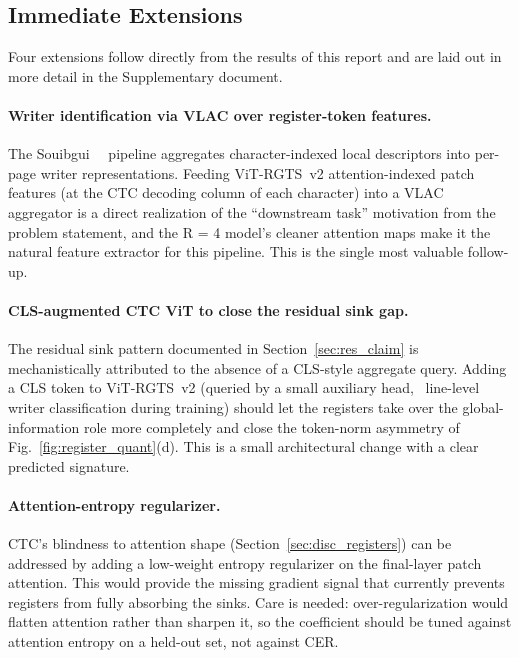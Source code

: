 \subsection{Immediate Extensions}

Four extensions follow directly from the results of this report and are laid out in more detail in the Supplementary document.

\paragraph{Writer identification via VLAC over register-token features.}
The Souibgui~\etal~\cite{souibgui2022vlac} pipeline aggregates character-indexed local descriptors into per-page writer representations. Feeding ViT-RGTS~v2 attention-indexed patch features (at the CTC decoding column of each character) into a VLAC aggregator is a direct realization of the ``downstream task'' motivation from the problem statement, and the R = 4 model's cleaner attention maps make it the natural feature extractor for this pipeline. This is the single most valuable follow-up.

\paragraph{CLS-augmented CTC ViT to close the residual sink gap.}
The residual sink pattern documented in Section~\ref{sec:res_claim} is mechanistically attributed to the absence of a CLS-style aggregate query. Adding a CLS token to ViT-RGTS~v2 (queried by a small auxiliary head, \eg\ line-level writer classification during training) should let the registers take over the global-information role more completely and close the token-norm asymmetry of Fig.~\ref{fig:register_quant}(d). This is a small architectural change with a clear predicted signature.

\paragraph{Attention-entropy regularizer.}
CTC's blindness to attention shape (Section~\ref{sec:disc_registers}) can be addressed by adding a low-weight entropy regularizer on the final-layer patch attention. This would provide the missing gradient signal that currently prevents registers from fully absorbing the sinks. Care is needed: over-regularization would flatten attention rather than sharpen it, so the coefficient should be tuned against attention entropy on a held-out set, not against CER.

